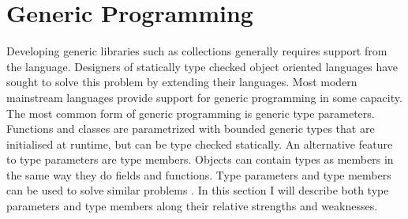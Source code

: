 \documentclass[11pt
              , a4paper
              , twoside
              , openright
              ]{report}
\numberwithin{case}{theorem}
\numberwithin{subcase}{case}
\begin{document}
\section{Generic Programming}
Developing generic libraries such as collections generally requires support from the language. Designers of statically type checked object oriented languages have sought to solve this problem by extending their languages. Most modern mainstream languages provide support for generic programming in some capacity. The most common form of generic programming is generic type parameters. Functions and classes are parametrized with bounded generic types that are initialised at runtime, but can be type checked statically. An alternative feature to type parameters are type members. Objects can contain types as members in the same way they do fields and functions. Type parameters and type members can be used to solve similar problems \cite{Igarashi1999}. In this section I will describe both type parameters and type members along their relative strengths and weaknesses. 
\end{document}
